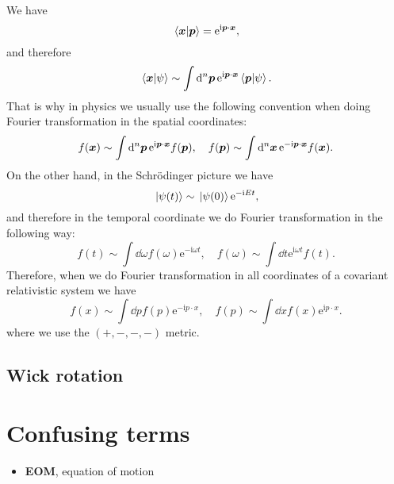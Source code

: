 \documentclass[hyperref, a4paper]{article}
\newcommand*{\ii}{\mathrm{i}}
\newcommand*{\ee}{\mathrm{e}}
\newcommand*{\concept}[1]{{\textbf{#1}}}
\begin{document}
We have 
\[
    \braket*{\vb*{x}}{\vb*{p}} = \ee^{\ii \vb*{p} \cdot \vb*{x}},
\]
and therefore 
\[
    \braket*{\vb*{x}}{\psi} \sim \int \dd[n]{\vb*{p}} \ee^{\ii \vb*{p} \cdot \vb*{x}} \braket*{\vb*{p}}{\psi}.
\]
That is why in physics we usually use the following convention when doing Fourier transformation in the spatial coordinates:
\begin{equation}
    f(\vb*{x}) \sim \int \dd[n]{\vb*{p}} \ee^{\ii \vb*{p} \cdot \vb*{x}} f(\vb*{p}), \quad f(\vb*{p}) \sim \int \dd[n]{\vb*{x}} \ee^{- \ii \vb*{p} \cdot \vb*{x}} f(\vb*{x}).
\end{equation}
On the other hand, in the Schrödinger picture we have 
\[
    \ket*{\psi(t)} \sim \ket*{\psi(0)} \ee^{- \ii E t},
\]
and therefore in the temporal coordinate we do Fourier transformation in the following way:
\begin{equation}
    f(t) \sim \int \dd{\omega} f(\omega) \ee^{- \ii \omega t}, \quad f(\omega) \sim \int \dd{t} \ee^{\ii \omega t} f(t).
\end{equation}
Therefore, when we do Fourier transformation in all coordinates of a covariant relativistic system we have 
\begin{equation}
    f(x) \sim \int \dd{p} f(p) \ee^{- \ii p \cdot x}, \quad f(p) \sim \int \dd{x} f(x) \ee^{\ii p \cdot x}.
\end{equation}
where we use the $(+, -, -, -)$ metric.

\subsection{Wick rotation}

\section{Confusing terms}

\begin{itemize}
    \item \concept{EOM}, equation of motion
\end{itemize}


 
\end{document}
